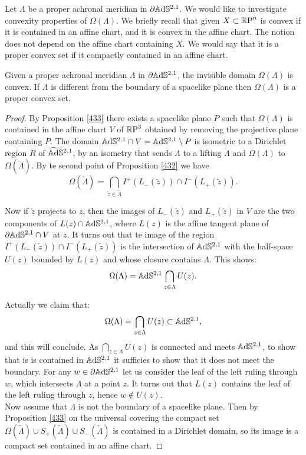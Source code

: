 Let $\Lambda$ be a proper achronal meridian in $\partial\mathbb{A}\mathrm{d}\mathbb{S}^{2,1}$. We would like to investigate convexity properties of $\Omega(\Lambda)$. We briefly recall that given $X \subset \mathbb{R}\text{P}^n$ is convex if it is contained in an affine chart, and it is convex in the affine chart. The notion does not depend on the affine chart containing $X$. We would say that it is a proper convex set if it compactly contained in an affine chart. 

\begin{proposition}\label{461}
    Given a proper achronal meridian $\Lambda$ in $\partial\mathbb{A}\mathrm{d}\mathbb{S}^{2,1}$, the invisible domain $\Omega(\Lambda)$ is convex. If $\Lambda$ is different from the boundary of a spacelike plane then $\Omega(\Lambda)$ is a proper convex set.
\end{proposition}

\begin{proof}
    By Proposition \ref{433} there exists a spacelike plane $P$ such that $\Omega(\Lambda)$ is contained in the affine chart $V$ of $\mathbb{R}\text{P}^3$ obtained by removing the projective plane containing $P$. The domain $\mathbb{A}\mathrm{d}\mathbb{S}^{2,1}\cap V=\mathbb{A}\mathrm{d}\mathbb{S}^{2,1}\setminus P$ is isometric to a Dirichlet region $R$ of $\widetilde{\mathbb{A}\mathrm{d}\mathbb{S}}{}^{2,1}$, by an isometry that sends $\Lambda$ to a lifting $\widetilde{\Lambda}$ and $\Omega(\Lambda)$ to $\Omega(\widetilde{\Lambda})$. By te second point of Proposition \ref{432} we have 
    \[
        \Omega(\widetilde{\Lambda})=\bigcap_{\widetilde{z}\in\widetilde{\Lambda}}I^+(L_-(\widetilde{z}))\cap I^-(L_+(\widetilde{z})).
    \]

    Now if $\widetilde{z}$ projects to $z$, then the images of $L_-(\widetilde{z})$ and $L_+(\widetilde{z})$ in $V$ are the two components of $L(z)\cap \mathbb{A}\mathrm{d}\mathbb{S}^{2,1}$, where $L(z)$ is the affine tangent plane of $\partial\mathbb{A}\mathrm{d}\mathbb{S}^{2,1}\cap V$ at $z$. It turns out that te image of the region $I^+(L_-(\widetilde{z}))\cap I^-(L_+(\widetilde{z}))$ is the intersection of $\mathbb{A}\mathrm{d}\mathbb{S}^{2,1}$ with the half-space $U(z)$ bounded by $L(z)$ and whose closure contains $\Lambda$. This shows: 
\[
    \Omega(\Lambda)=\mathbb{A}\mathrm{d}\mathbb{S}^{2,1}\bigcap_{z\in\Lambda}U(z).
\] 

Actually we claim that:
\[
    \Omega(\Lambda)=\bigcap_{z\in\Lambda}U(z)\subset \mathbb{A}\mathrm{d}\mathbb{S}^{2,1},
\]
and this will conclude. As $\bigcap_{z\in\Lambda}U(z)$ is connected and meets $\mathbb{A}\mathrm{d}\mathbb{S}^{2,1}$, to show that is is contained in $\mathbb{A}\mathrm{d}\mathbb{S}^{2,1}$ it sufficies to show that it does not meet the boundary. For any $w\in\partial\mathbb{A}\mathrm{d}\mathbb{S}^{2,1}$ let us consider the leaf of the left ruling through $w$, which intersects $\Lambda$ at a point $z$. It turns out that $L(z)$ contains the leaf of the left ruling through $z$, hence $w\notin U(z)$. \\
Now assume that $\Lambda$ is not the boundary of a spacelike plane. Then by Proposition \ref{433} on the universal covering the compact set $\Omega(\widetilde{\Lambda})\cup S_+(\widetilde{\Lambda})\cup S_-(\widetilde{\Lambda})$ is contained in a Dirichlet domain, so its image is a compact set contained in an affine chart.
\end{proof}

